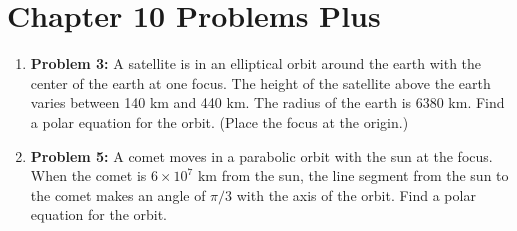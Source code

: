 \documentclass[12pt, a4paper]{article}
\begin{document}
\hrulefill
\vspace{1em}

\section*{Chapter 10 Problems Plus}

\begin{enumerate}
    \item \textbf{Problem 3:} A satellite is in an elliptical orbit around the earth with the center of the earth at one focus. The height of the satellite above the earth varies between 140 km and 440 km. The radius of the earth is 6380 km. Find a polar equation for the orbit. (Place the focus at the origin.)
    
    \item \textbf{Problem 5:} A comet moves in a parabolic orbit with the sun at the focus. When the comet is $6 \times 10^7$ km from the sun, the line segment from the sun to the comet makes an angle of $\pi/3$ with the axis of the orbit. Find a polar equation for the orbit.
\end{enumerate}
\end{document}
